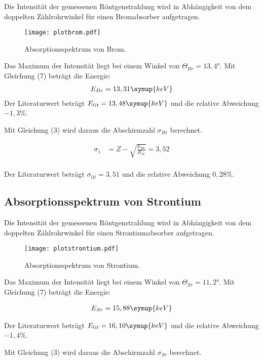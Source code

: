 Die Intensität der gemessenen Röntgenstrahlung wird in Abhängigkeit von dem doppelten Zählrohrwinkel für
einen Bromabsorber aufgetragen.

\begin{figure}[H]
  \centering
  \texttt{[image: plotbrom.pdf]}
  \caption{Absorptionsspektrum von Brom.}
  \label{fig:plot}
\end{figure}

Das Maximum der Intensität liegt bei einem Winkel von $\Theta_{Br} = 13,4°$.
Mit Gleichung (7) beträgt die Energie:
\begin{align*}
  E_{Br} = 13,31 \symup{keV}
\end{align*}
Der Literaturwert beträgt $E_{lit} = 13,48 \symup{keV}$ und die relative Abweichung $-1,3\%$.

Mit Gleichung (3) wird daraus die Abschirmzahl $\sigma_{Br}$  berechnet.

\begin{align*}
  \sigma_1 &= Z - \sqrt{\frac{E_{Br}}{R_{\infty}}} = 3,52 \\
\end{align*}

Der Literaturwert beträgt $\sigma_{lit} = 3,51$ und die relative Abweichung $0,28\%$.

\subsection{Absorptionsspektrum von Strontium}

Die Intensität der gemessenen Röntgenstrahlung wird in Abhängigkeit von dem doppelten Zählrohrwinkel für
einen Strontiumabsorber aufgetragen.

\begin{figure}[H]
  \centering
  \texttt{[image: plotstrontium.pdf]}
  \caption{Absorptionsspektrum von Strontium.}
  \label{fig:plot}
\end{figure}

Das Maximum der Intensität liegt bei einem Winkel von $\Theta_{Sr} = 11,2°$.
Mit Gleichung (7) beträgt die Energie:

\begin{align*}
  E_{Sr} = 15,88 \symup{keV}
\end{align*}

Der Literaturwert beträgt $E_{lit} = 16,10 \symup{keV}$ und die relative Abweichung $-1,4\%$.


Mit Gleichung (3) wird daraus die Abschirmzahl $\sigma_{Sr}$  berechnet.

